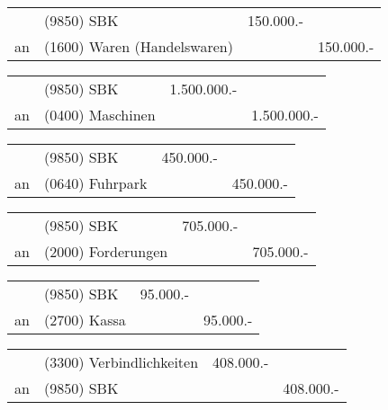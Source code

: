 \documentclass[parskip=half,12pt,a4paper]{scrartcl}
\begin{document}
\begin{center}
\begin{tabularx}{\textwidth}{rXrr}
 \toprule
    & (9850) SBK & 150.000.- &\\
 an & (1600) Waren (Handelswaren) & & 150.000.-\\
\bottomrule
\end{tabularx}
\end{center}

\begin{center}
	\begin{tabularx}{\textwidth}{rXrr}
		\toprule
		& (9850) SBK & 1.500.000.- &\\
		an & (0400) Maschinen & & 1.500.000.-\\
		\bottomrule
	\end{tabularx}
\end{center}

\begin{center}
	\begin{tabularx}{\textwidth}{rXrr}
		\toprule
		& (9850) SBK & 450.000.- &\\
		an & (0640) Fuhrpark & & 450.000.-\\
		\bottomrule
	\end{tabularx}
\end{center}

\begin{center}
	\begin{tabularx}{\textwidth}{rXrr}
		\toprule
		& (9850) SBK & 705.000.- &\\
		an & (2000) Forderungen & & 705.000.-\\
		\bottomrule
	\end{tabularx}
\end{center}

\begin{center}
\begin{tabularx}{\textwidth}{rXrr}
 \toprule
    & (9850) SBK & 95.000.- &\\
 an & (2700) Kassa & & 95.000.-\\
\bottomrule
\end{tabularx}
\end{center}

\begin{center}
\begin{tabularx}{\textwidth}{rXrr}
 \toprule
    & (3300) Verbindlichkeiten & 408.000.- &\\
 an & (9850) SBK & & 408.000.-\\
\bottomrule
\end{tabularx}
\end{center}
\end{document}
